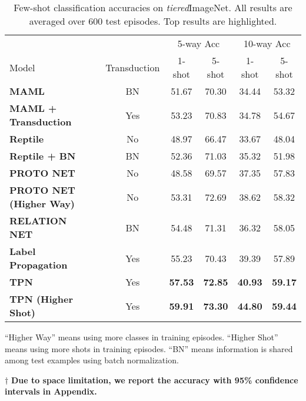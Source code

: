 \documentclass{article} \usepackage{iclr2019_conference,times}
\def\tiered{{\textit{tiered}ImageNet}}
\begin{document}
\begin{table}[t]
\centering
\begin{threeparttable}
\small
\caption{Few-shot classification accuracies on \tiered. All results are averaged over 600 test episodes. Top results are highlighted.}
\label{tiered-results}
\begin{tabular}{lccccc}
\hline
                                       						&              & \multicolumn{2}{c}{5-way Acc} & \multicolumn{2}{c}{10-way Acc}                           \\
Model                                  						& Transduction & \multicolumn{1}{c}{1-shot} & \multicolumn{1}{c}{5-shot} & \multicolumn{1}{c}{1-shot} & \multicolumn{1}{c}{5-shot} \\ \hline
\textbf{MAML~\citep{maml}}                          		& BN & 51.67  & 70.30 & 34.44 & 53.32  \\
\textbf{MAML + Transduction}                                & Yes & 53.23  & 70.83 & 34.78 & 54.67  \\
\textbf{Reptile~\citep{first-order}}                        & No & 48.97  & 66.47 & 33.67 & 48.04  \\
\textbf{Reptile + BN~\citep{first-order}}                   & BN & 52.36  & 71.03 & 35.32 & 51.98  \\
\textbf{PROTO NET~\citep{prototypical}}                     & No & 48.58  & 69.57 & 37.35 & 57.83  \\
\textbf{PROTO NET (Higher Way)~\citep{prototypical}}        & No & 53.31  & 72.69 & 38.62 & 58.32  \\
\textbf{RELATION NET~\citep{compare}}                  		& BN & 54.48  & 71.31 & 36.32 & 58.05  \\ \hline
\textbf{Label Propagation}                                  & Yes & 55.23  & 70.43 & 39.39 & 57.89  \\
\textbf{TPN}     				                            & Yes & \textbf{57.53}  & \textbf{72.85} & \textbf{40.93} & \textbf{59.17}   \\
\textbf{TPN (Higher Shot)}   	                            & Yes & \textbf{59.91}  & \textbf{73.30} & \textbf{44.80} & \textbf{59.44}   \\ \hline
\end{tabular}
\begin{tablenotes}
  	\item * ``Higher Way'' means using more classes in training episodes. ``Higher Shot'' means using more shots in training episodes. ``BN'' means information is shared among test examples using batch normalization.
  	\item $\dagger$ \textbf{Due to space limitation, we report the accuracy with 95\% confidence intervals in Appendix.}
\end{tablenotes} 
\end{threeparttable}
\end{table}
\end{document}
